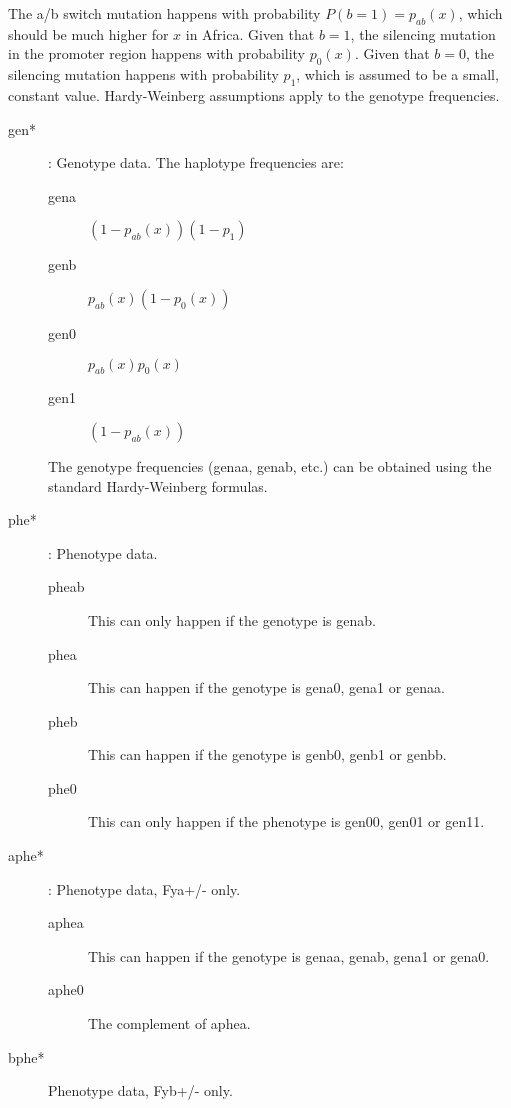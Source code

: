 \documentclass[a4paper]{article}
\begin{document}
The a/b switch mutation happens with probability $P(b=1)=p_{ab}(x)$, which should be much higher for $x$ in Africa. Given that $b=1$, the silencing mutation in the promoter region happens with probability $p_0(x)$. Given that $b=0$, the silencing mutation happens with probability $p_1$, which is assumed to be a small, constant value. Hardy-Weinberg assumptions apply to the genotype frequencies.
\begin{description}
    \item[gen*]: Genotype data. The haplotype frequencies are:
    \begin{description}
        \item[gena] $(1-p_{ab}(x))(1-p_1)$
        \item[genb] $p_{ab}(x)(1-p_0(x))$ 
        \item[gen0] $p_{ab}(x)p_0(x)$
        \item[gen1] $(1-p_{ab}(x))$
    \end{description}
    The genotype frequencies (genaa, genab, etc.) can be obtained using the standard Hardy-Weinberg formulas.
    \item[phe*]: Phenotype data.
    \begin{description}
        \item[pheab] This can only happen if the genotype is genab.
        \item[phea] This can happen if the genotype is gena0, gena1 or genaa.
        \item[pheb] This can happen if the genotype is genb0, genb1 or genbb.
        \item[phe0] This can only happen if the phenotype is gen00, gen01 or gen11.
    \end{description}
    \item[aphe*]: Phenotype data, Fya+/- only.
    \begin{description}
        \item[aphea] This can happen if the genotype is genaa, genab, gena1 or gena0.
        \item[aphe0] The complement of aphea.
    \end{description}
    \item[bphe*] Phenotype data, Fyb+/- only.

\end{description}
\end{document}
